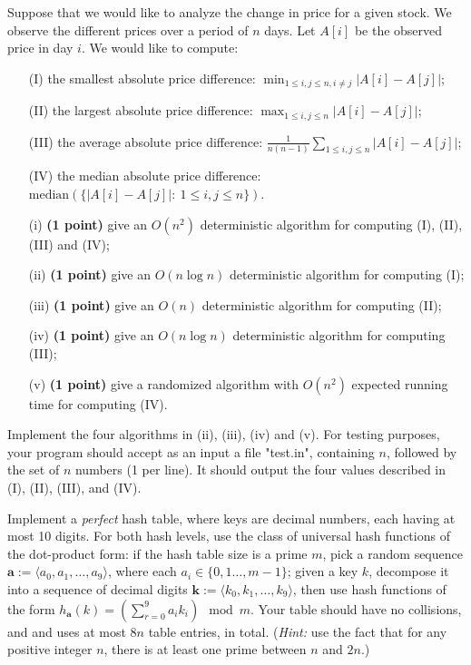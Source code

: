 \documentclass{article}
\begin{document}
Suppose that we would like to analyze the change in price for a given
stock. We observe the different prices over a period of $n$ days. Let
$A[i]$ be the observed price in day $i$. We would like to compute: 
\begin{enumerate}
\item[(I)]  the smallest absolute price difference: $\min_{1\le i,j\le n,i\ne j}|A[i]-A[j]|$; 
\item[(II)] the largest absolute price difference: $\max_{1\le i,j\le n}|A[i]-A[j]|$; 
\item[(III)]  the average absolute price difference: $\frac{1}{n(n-1)}\sum_{1\le i,j\le n}|A[i]-A[j]|$; 
\item[(IV)]  the median absolute price difference: $\text{median}(\{|A[i]-A[j]|:~1\le i,j\le n\})$. 
\end{enumerate}
\begin{enumerate}
\item[(i)] \textbf{(1 point)} give an $O(n^2)$ deterministic algorithm for computing (I), (II), (III) and (IV);  
\item[(ii)] \textbf{(1 point)} give an $O(n\log n)$ deterministic algorithm for computing (I); 
\item[(iii)] \textbf{(1 point)} give an $O(n)$ deterministic algorithm for computing (II); 
\item[(iv)] \textbf{(1 point)} give an $O(n\log n)$ deterministic algorithm for computing (III); 
\item[(v)] \textbf{(1 point)}  give a randomized algorithm with $O(n^2)$ expected running time for computing (IV).
\end{enumerate}
Implement the four algorithms in (ii), (iii), (iv) and (v). For
testing purposes, your program  should accept as an input a file
"test.in", containing $n$, followed by the set of $n$ numbers (1 per
line). It should output the four values described in (I), (II), (III),
and (IV).  
\medskip 

Implement a {\it perfect} hash table, where keys are decimal numbers,
each having at most 10 digits. For both hash levels, use the class of
universal hash functions of the dot-product form: if the hash table
size is a prime $m$, pick a random sequence $\mathbf{a}:=\langle
a_0,a_1,\ldots,a_9\rangle$, where each $a_i\in\{0,1\ldots,m-1\}$;
given a key $k$, decompose it into a sequence of decimal digits
$\mathbf k:=\langle k_0,k_1,\ldots,k_9\rangle$, then use hash
functions of the form $ h_{\mathbf{a}}(k)=(\sum_{r=0}^9a_ik_i)\mod m$.   
Your table should have  no collisions, and and uses at most $8n$ table
entries, in total. ({\it Hint:} use the fact that for any positive
integer $n$, there is at least one prime between $n$ and $2n$.) 
\end{document}
